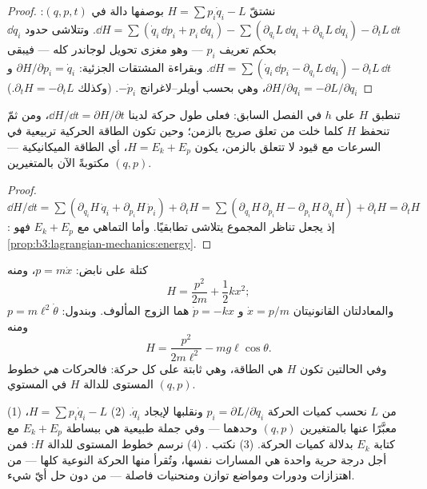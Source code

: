 \begin{proof}
نشتقّ $H = \sum p_i\dot q_i - L$ بوصفها دالة في $(q, p, t)$:
$\dd H = \sum(\dot q_i\,\dd p_i + p_i\,\dd\dot q_i) - \sum(
\partial_{q_i}L\,\dd q_i + \partial_{\dot q_i}L\,\dd\dot q_i) -
\partial_tL\,\dd t$. وتتلاشى حدود $\dd\dot q_i$ بحكم تعريف
$p_i$ --- وهو مغزى تحويل لوجاندر كله --- فيبقى
$\dd H = \sum(\dot q_i\,\dd p_i - \partial_{q_i}L\,\dd q_i) -
\partial_tL\,\dd t$. وبقراءة المشتقات الجزئية:
$\partial H/\partial p_i = \dot q_i$ و $\partial H/\partial q_i =
-\partial L/\partial q_i$، وهي بحسب أويلر--لاغرانج $-\dot p_i$.
(وكذلك $\partial_tH = -\partial_tL$.)
\end{proof}

\begin{proposition}[ما هي $H$]\label{prop:b3:hamiltonian-mechanics:energy}
تنطبق $H$ على  $h$ في الفصل السابق: فعلى طول حركة
لدينا $\dd H/\dd t = \partial H/\partial t$، ومن ثمّ تنحفظ $H$
كلما خلت من تعلق صريح بالزمن؛ وحين تكون الطاقة الحركية تربيعية
في السرعات مع قيود لا تتعلق بالزمن، يكون $H = E_k + E_p$، أي
الطاقة الميكانيكية --- مكتوبةً الآن بالمتغيرين $(q, p)$.
\end{proposition}

\begin{proof}
$\dd H/\dd t = \sum(\partial_{q_i}H\,\dot q_i + \partial_{p_i}H\,\dot
p_i) + \partial_tH = \sum(\partial_{q_i}H\,\partial_{p_i}H -
\partial_{p_i}H\,\partial_{q_i}H) + \partial_tH = \partial_tH$: إذ
يجعل تناظر  المجموع يتلاشى تطابقيًا. وأما
التماهي مع $E_k + E_p$ فهو
\cref{prop:b3:lagrangian-mechanics:energy}.
\end{proof}

\begin{example}[هاميلتونيتان]\label{ex:b3:hamiltonian-mechanics:examples}
كتلة على نابض: $p = m\dot x$، ومنه
\[
H = \frac{p^2}{2m} + \frac12 kx^2 ;
\]
والمعادلتان القانونيتان $\dot x = p/m$ و $\dot p = -kx$ هما الزوج
المألوف. وبندول: $p = m\ell^2\dot\theta$ ومنه
\[
H = \frac{p^2}{2m\ell^2} - mg\ell\cos\theta .
\]
وفي الحالتين تكون $H$ هي الطاقة، وهي ثابتة على كل حركة: فالحركات
\emph{هي} خطوط المستوى للدالة $H$ في المستوي $(q,p)$.
\end{example}

\begin{method}\label{met:b3:hamiltonian-mechanics:recipe}
(1) من $L$ نحسب كميات الحركة $p_i = \partial L/\partial\dot q_i$
ونقلبها لإيجاد $\dot q_i$. (2) $H = \sum p_i\dot q_i - L$،
معبَّرًا عنها بالمتغيرين $(q, p)$ وحدهما --- وفي جملة طبيعية هي ببساطة $E_k + E_p$
مع كتابة $E_k$ بدلالة كميات الحركة. (3) نكتب . (4) نرسم خطوط المستوى للدالة $H$: فمن أجل درجة حرية
واحدة هي المسارات نفسها، وتُقرأ منها الحركة النوعية كلها --- من
اهتزازات ودورات ومواضع توازن ومنحنيات فاصلة --- من دون حل أيّ
شيء.
\end{method}

